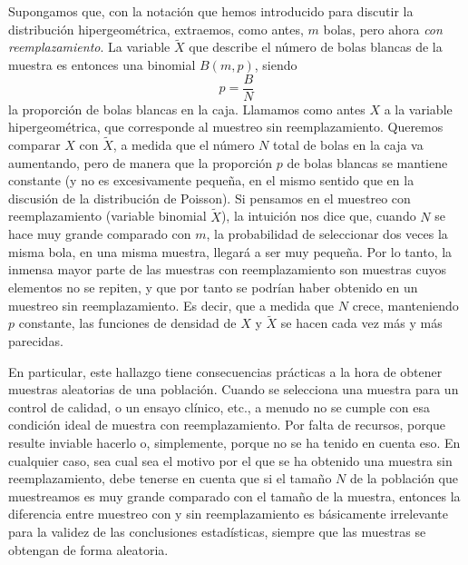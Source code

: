 Supongamos que, con la notación que hemos introducido para discutir la distribución hipergeométrica, extraemos, como antes, $m$ bolas, pero ahora {\em con reemplazamiento}. La variable $\tilde X$ que describe el número de bolas blancas de la muestra es entonces una binomial $B(m,p)$, siendo
\[p=\dfrac{B}{N}\]
la proporción de bolas blancas en la caja. Llamamos como antes $X$ a la variable hipergeométrica, que corresponde al muestreo sin reemplazamiento. Queremos comparar $X$ con $\tilde X$, a medida que el
número $N$ total de bolas en la caja va aumentando, pero de manera que la proporción $p$ de bolas blancas
se mantiene constante (y no es excesivamente pequeña, en el mismo sentido que en la discusión de la distribución de Poisson). Si pensamos en el muestreo con reemplazamiento (variable binomial $\tilde X$), la intuición nos dice que, cuando $N$ se hace muy grande comparado con $m$, la probabilidad de seleccionar dos veces la misma bola, en una misma muestra, llegará a ser muy pequeña.  Por lo tanto, la inmensa mayor parte de las muestras con reemplazamiento son muestras cuyos elementos no se repiten, y que por tanto se podrían haber obtenido en un muestreo sin reemplazamiento. Es decir, que a medida que $N$ crece, manteniendo $p$ constante, las funciones de densidad de $X$ y $\tilde X$ se hacen cada vez más y más parecidas.
    \begin{center}
    \end{center}
En particular, este hallazgo tiene consecuencias prácticas a la hora de obtener muestras aleatorias de una población. Cuando se selecciona una muestra para un control de calidad, o un ensayo clínico, etc., a menudo no se cumple con esa condición ideal de muestra con reemplazamiento. Por falta de recursos, porque resulte inviable hacerlo o, simplemente, porque no se ha tenido en cuenta eso. En cualquier caso, sea cual sea el motivo por el que se ha obtenido una muestra sin reemplazamiento, debe tenerse en cuenta que si el tamaño $N$ de la población que muestreamos es muy grande comparado con el tamaño de la muestra, entonces la diferencia entre muestreo con y sin reemplazamiento es básicamente irrelevante para la validez de las conclusiones estadísticas, siempre que las muestras se obtengan de forma aleatoria.\\

